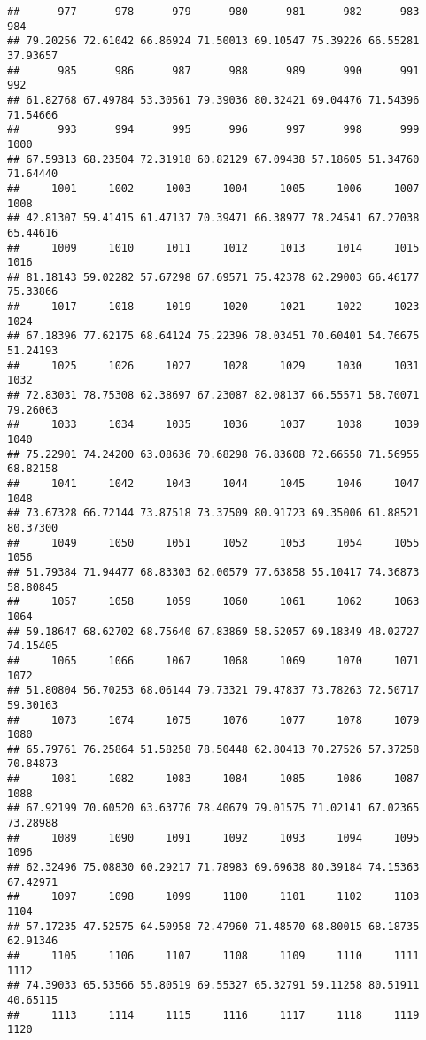 \documentclass[
]{article}
\begin{document}
\begin{verbatim}
##      977      978      979      980      981      982      983      984 
## 79.20256 72.61042 66.86924 71.50013 69.10547 75.39226 66.55281 37.93657 
##      985      986      987      988      989      990      991      992 
## 61.82768 67.49784 53.30561 79.39036 80.32421 69.04476 71.54396 71.54666 
##      993      994      995      996      997      998      999     1000 
## 67.59313 68.23504 72.31918 60.82129 67.09438 57.18605 51.34760 71.64440 
##     1001     1002     1003     1004     1005     1006     1007     1008 
## 42.81307 59.41415 61.47137 70.39471 66.38977 78.24541 67.27038 65.44616 
##     1009     1010     1011     1012     1013     1014     1015     1016 
## 81.18143 59.02282 57.67298 67.69571 75.42378 62.29003 66.46177 75.33866 
##     1017     1018     1019     1020     1021     1022     1023     1024 
## 67.18396 77.62175 68.64124 75.22396 78.03451 70.60401 54.76675 51.24193 
##     1025     1026     1027     1028     1029     1030     1031     1032 
## 72.83031 78.75308 62.38697 67.23087 82.08137 66.55571 58.70071 79.26063 
##     1033     1034     1035     1036     1037     1038     1039     1040 
## 75.22901 74.24200 63.08636 70.68298 76.83608 72.66558 71.56955 68.82158 
##     1041     1042     1043     1044     1045     1046     1047     1048 
## 73.67328 66.72144 73.87518 73.37509 80.91723 69.35006 61.88521 80.37300 
##     1049     1050     1051     1052     1053     1054     1055     1056 
## 51.79384 71.94477 68.83303 62.00579 77.63858 55.10417 74.36873 58.80845 
##     1057     1058     1059     1060     1061     1062     1063     1064 
## 59.18647 68.62702 68.75640 67.83869 58.52057 69.18349 48.02727 74.15405 
##     1065     1066     1067     1068     1069     1070     1071     1072 
## 51.80804 56.70253 68.06144 79.73321 79.47837 73.78263 72.50717 59.30163 
##     1073     1074     1075     1076     1077     1078     1079     1080 
## 65.79761 76.25864 51.58258 78.50448 62.80413 70.27526 57.37258 70.84873 
##     1081     1082     1083     1084     1085     1086     1087     1088 
## 67.92199 70.60520 63.63776 78.40679 79.01575 71.02141 67.02365 73.28988 
##     1089     1090     1091     1092     1093     1094     1095     1096 
## 62.32496 75.08830 60.29217 71.78983 69.69638 80.39184 74.15363 67.42971 
##     1097     1098     1099     1100     1101     1102     1103     1104 
## 57.17235 47.52575 64.50958 72.47960 71.48570 68.80015 68.18735 62.91346 
##     1105     1106     1107     1108     1109     1110     1111     1112 
## 74.39033 65.53566 55.80519 69.55327 65.32791 59.11258 80.51911 40.65115 
##     1113     1114     1115     1116     1117     1118     1119     1120 

\end{verbatim}
\end{document}
